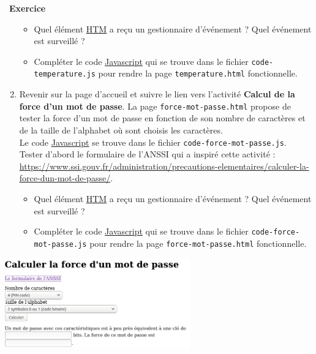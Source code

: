 \documentclass[
  11pt,
]{article}
\newcommand{\passthrough}[1]{#1}
\newcounter{exo}
\newenvironment{exercice}[1]
{\par \medskip   \addtocounter{exo}{1} \noindent  
\begin{bclogo}[arrondi =0.1,   noborder = true, logo=\bccrayon, marge=4]{~\textbf{Exercice} \textbf{\theexo} {\itshape #1} }  \par}
{
\end{bclogo}
 \par \bigskip }
\newcounter{prop}
\begin{document}
\begin{exercice}{}
\begin{enumerate}
  \begin{itemize}
  \item
    Quel élément
    \href{https://developer.mozilla.org/fr/docs/Glossaire/HTML}{HTM} a
    reçu un gestionnaire d'événement ? Quel événement est surveillé ?
  \item
    Compléter le code
    \href{https://developer.mozilla.org/fr/docs/Glossaire/JavaScript}{Javascript}
    qui se trouve dans le fichier
    \passthrough{\lstinline!code-temperature.js!} pour rendre la page
    \passthrough{\lstinline!temperature.html!} fonctionnelle.
  \end{itemize}
\item
  Revenir sur la page d'accueil et suivre le lien vers l'activité
  \textbf{Calcul de la force d'un mot de passe}. La page
  \passthrough{\lstinline!force-mot-passe.html!} propose de tester la
  force d'un mot de passe en fonction de son nombre de caractères et de
  la taille de l'alphabet où sont choisis les caractères.\\
  Le code
  \href{https://developer.mozilla.org/fr/docs/Glossaire/JavaScript}{Javascript}
  se trouve dans le fichier
  \passthrough{\lstinline!code-force-mot-passe.js!}.\\
  Tester d'abord le formulaire de l'ANSSI qui a inspiré cette activité :
  \url{https://www.ssi.gouv.fr/administration/precautions-elementaires/calculer-la-force-dun-mot-de-passe/}.

  \begin{itemize}
  \item
    Quel élément
    \href{https://developer.mozilla.org/fr/docs/Glossaire/HTML}{HTM} a
    reçu un gestionnaire d'événement ? Quel événement est surveillé ?
  \item
    Compléter le code
    \href{https://developer.mozilla.org/fr/docs/Glossaire/JavaScript}{Javascript}
    qui se trouve dans le fichier
    \passthrough{\lstinline!code-force-mot-passe.js!} pour rendre la
    page \passthrough{\lstinline!force-mot-passe.html!} fonctionnelle.
  \end{itemize}
\end{enumerate}

\includegraphics[width=0.6\textwidth,height=\textheight]{images/force-mot-passe.png}\\

\end{exercice}
\end{document}
